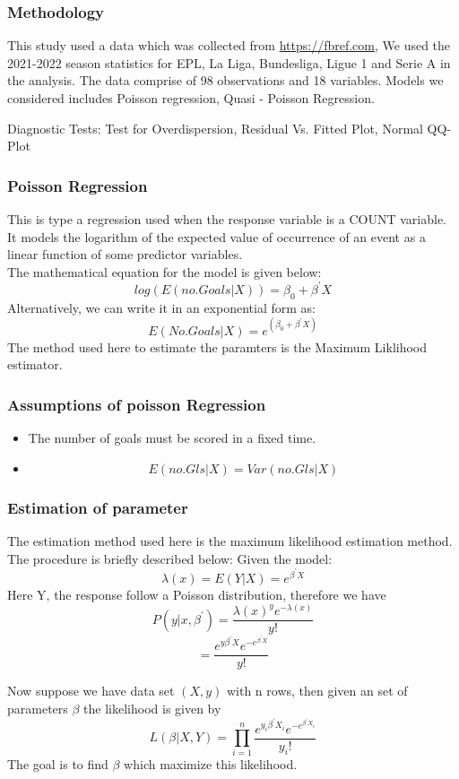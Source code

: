 \documentclass[11pt]{beamer}
\begin{document}
	\begin{frame}
		\frametitle{Methodology}
		This study used  a data which was collected from \url{ https://fbref.com}, 
		We used the
		2021-2022 season statistics for EPL, La Liga, Bundesliga, Ligue 1 and Serie A in the analysis. The data comprise of 98 observations and 18 variables.
		Models we considered includes
		Poisson regression,
		Quasi - Poisson Regression.
		
		Diagnostic Tests: Test for Overdispersion, Residual Vs. Fitted Plot, Normal QQ-Plot
	\end{frame}
	
	\begin{frame}
		\frametitle{Poisson Regression}
		This is type a regression used when the response variable is a COUNT variable. It models the logarithm of the expected value of occurrence of an event as a linear function of some predictor variables.\\
		The mathematical equation for the model is given below:
		\[log(E(no.Goals|X))= \beta_0+\beta^{'}X\]
		Alternatively, we can write it in an exponential form as:
		\[E(No.Goals|X)= e^{(\beta_0+\beta^{'}X)}\]
		The method used here to estimate the paramters is the Maximum Liklihood estimator.	
		
	\end{frame}
	
	\begin{frame}
		\frametitle{Assumptions of poisson Regression}
		\begin{itemize}
			\item The number of goals must be scored in a fixed time.
			\item \[E(no.Gls|X) =Var(no.Gls|X)\]
		\end{itemize}
	\end{frame}
	\begin{frame}
		\frametitle{Estimation of parameter}
		The estimation method used here is the maximum likelihood estimation method.
		The procedure is briefly described below:
		Given the model:
		\[\lambda(x)= E(Y|X)= e^{\beta^{'}X}\]
		Here Y, the response follow a Poisson distribution, therefore we have
		\[P(y|x,\beta^{'})= \frac{\lambda(x)^y e^{-\lambda(x)}}{y!}\]   \[= \frac{e^{y \beta^{'}X} e^{-e^{\beta^{'}X}}}{y!}\]
		
		Now suppose we have  data set $(X,y)$ with n rows, then given an set of parameters $\beta$ the likelihood is given by
		\[L(\beta|X,Y)= \prod_{i=1}^{n} \frac{e^{y_i \beta^{'}X_i} e^{-e^{\beta^{'}X_i}}}{y_i!}\]
		The goal is to find $\beta$ which maximize this likelihood.
	\end{frame}
	
\end{document}
